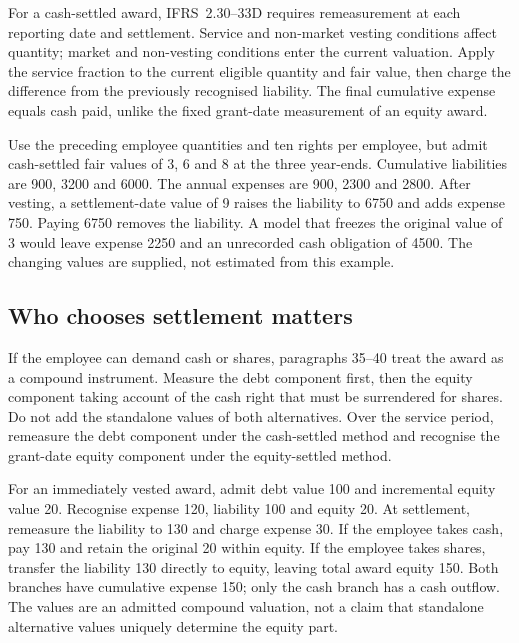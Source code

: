 For a cash-settled award, IFRS~2.30--33D \citep[IFRS~2.30--33D]{eu20231803} requires remeasurement at each reporting date and settlement. Service and non-market vesting conditions affect quantity; market and non-vesting conditions enter the current valuation. Apply the service fraction to the current eligible quantity and fair value, then charge the difference from the previously recognised liability. The final cumulative expense equals cash paid, unlike the fixed grant-date measurement of an equity award.

Use the preceding employee quantities and ten rights per employee, but admit cash-settled fair values of 3, 6 and 8 at the three year-ends. Cumulative liabilities are 900, 3200 and 6000. The annual expenses are 900, 2300 and 2800. After vesting, a settlement-date value of 9 raises the liability to 6750 and adds expense 750. Paying 6750 removes the liability. A model that freezes the original value of 3 would leave expense 2250 and an unrecorded cash obligation of 4500. The changing values are supplied, not estimated from this example.

\hypertarget{who-chooses-settlement-matters}{%
\subsection{Who chooses settlement matters}\label{who-chooses-settlement-matters}}

If the employee can demand cash or shares, paragraphs 35--40 \citep[IFRS~2.35--43]{eu20231803} treat the award as a compound instrument. Measure the debt component first, then the equity component taking account of the cash right that must be surrendered for shares. Do not add the standalone values of both alternatives. Over the service period, remeasure the debt component under the cash-settled method and recognise the grant-date equity component under the equity-settled method.

For an immediately vested award, admit debt value 100 and incremental equity value 20. Recognise expense 120, liability 100 and equity 20. At settlement, remeasure the liability to 130 and charge expense 30. If the employee takes cash, pay 130 and retain the original 20 within equity. If the employee takes shares, transfer the liability 130 directly to equity, leaving total award equity 150. Both branches have cumulative expense 150; only the cash branch has a cash outflow. The values are an admitted compound valuation, not a claim that standalone alternative values uniquely determine the equity part.

